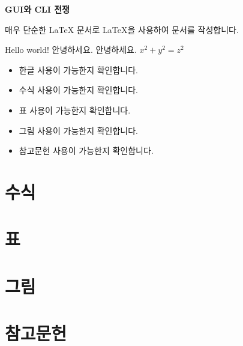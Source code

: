 \documentclass[12pt]{oblivoir}
\begin{document}
\textbf{GUI와 CLI 전쟁}

\bigskip

매우 단순한 \LaTeX\/ 문서로 \LaTeX\/을 사용하여 문서를 작성합니다.

Hello world!
안녕하세요. 안녕하세요. 
$x^2 + y^2 = z^2 $ %

\begin{itemize}
  \item 한글 사용이 가능한지 확인합니다.
  \item 수식 사용이 가능한지 확인합니다.
  \item 표 사용이 가능한지 확인합니다.
  \item 그림 사용이 가능한지 확인합니다.
  \item 참고문헌 사용이 가능한지 확인합니다.
\end{itemize}

\section{수식}

\section{표}

\section{그림}

\section{참고문헌}
\end{document}
